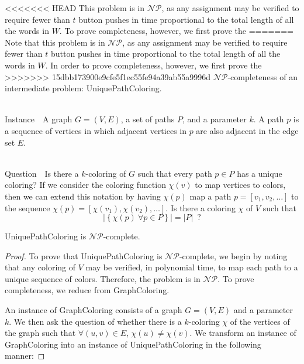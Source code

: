 \documentclass[runningheads]{llncs}
\newcommand{\NP}{\ensuremath{\mathcal{NP}}}
\newcommand{\Instance}{{\sc Instance~}}
\newcommand{\Question}{~\\
{\sc Question~}}
\begin{document}
\begin{prob}[{\sc
MinimumKeystrokes}]
<<<<<<< HEAD
This problem is in \NP, as any assignment may be verified to require
fewer than $t$ button pushes in time proportional to the total length of all
the words in $W$.  To prove completeness, however, we first prove the
=======
Note that this problem is in \NP, as any assignment may be verified to require
fewer than $t$ button pushes in time proportional to the total length of all
the words in $W$.  In order to prove completeness, however, we first prove the
>>>>>>> 15dbb173900e9cfe5f1ec55fe94a39ab55a9996d
\NP-completeness of an intermediate problem: {\sc UniquePathColoring}.

\begin{prob}[{\sc UniquePathColoring}]~\\
\label{upcolor}
\Instance\ A graph $G=(V,E)$, a set of paths $P$, and a parameter $k$.  A path
$p$ is a sequence of vertices in which adjacent vertices in $p$ are also
adjacent in the edge set $E$.

\Question\ Is there a $k$-coloring of $G$ such that every path $p\in P$ has a
unique coloring?  If we consider the coloring function $\chi(v)$ to map
vertices to colors, then we can extend this notation by having $\chi(p)$ map a
path $p = [ v_1, v_2, \ldots ]$ to the sequence $\chi(p) = [ \chi(v_1),
\chi(v_2), \ldots ]$.  Is there a coloring $\chi$ of $V$ such that 
    $$|\left\{ \chi(p)~\forall p \in P\right\}| = |P|\enspace ?$$
\end{prob}

\begin{theorem}{\sc UniquePathColoring} is \NP-complete.\end{theorem}
\begin{proof}
To prove that {\sc UniquePathColoring} is \NP-complete, we begin by noting that
any coloring of $V$ may be verified, in polynomial time, to map each path to a
unique sequence of colors.  Therefore, the problem is in \NP.  To prove
completeness, we reduce from {\sc GraphColoring}\cite{gandj}.

An instance of {\sc GraphColoring } consists of a graph $G=(V,E)$ and a
parameter $k$.  We then ask the question of whether there is a $k$-coloring
$\chi$ of the vertices of the graph such that $\forall (u,v)\in E$, $\chi(u)
\neq \chi(v)$.  We transform an instance of {\sc GraphColoring} into an
instance of {\sc UniquePathColoring} in the following manner:


\end{proof}
\end{prob}
\end{document}
